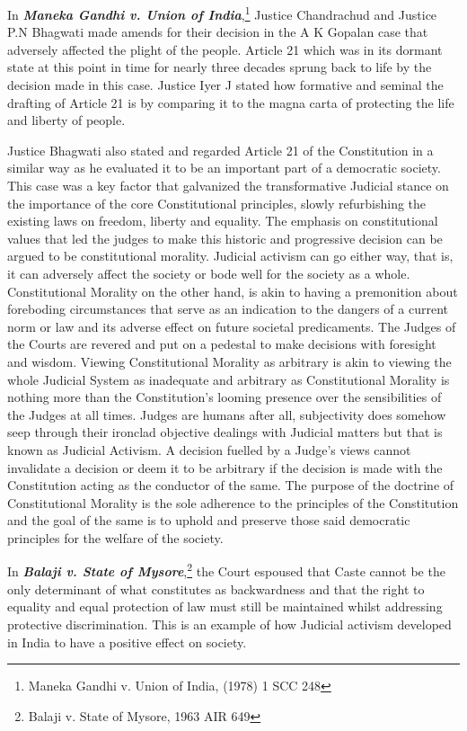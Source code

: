 \begin{multicols}{2}
\noi
In \textbf{\textit{Maneka Gandhi v. Union of India}},\footnote{Maneka Gandhi v. Union of India, (1978) 1 SCC 248}  Justice Chandrachud and Justice P.N Bhagwati made
amends for their decision in the A K Gopalan case that adversely affected the plight of the
people. Article 21 which was in its dormant state at this point in time for nearly three decades
sprung back to life by the decision made in this case. Justice Iyer J stated how formative and seminal the drafting of Article 21 is by comparing it to the magna carta of protecting the life
and liberty of people.

\noi
Justice Bhagwati also stated and regarded Article 21 of the Constitution in a similar way as
he evaluated it to be an important part of a democratic society. This case was a key factor that
galvanized the transformative Judicial stance on the importance of the core Constitutional
principles, slowly refurbishing the existing laws on freedom, liberty and equality. The
emphasis on constitutional values that led the judges to make this historic and progressive
decision can be argued to be constitutional morality. Judicial activism can go either way, that
is, it can adversely affect the society or bode well for the society as a whole. Constitutional
Morality on the other hand, is akin to having a premonition about foreboding circumstances
that serve as an indication to the dangers of a current norm or law and its adverse effect on
future societal predicaments. The Judges of the Courts are revered and put on a pedestal to
make decisions with foresight and wisdom. Viewing Constitutional Morality as arbitrary is
akin to viewing the whole Judicial System as inadequate and arbitrary as Constitutional
Morality is nothing more than the Constitution’s looming presence over the sensibilities of
the Judges at all times. Judges are humans after all, subjectivity does somehow seep through
their ironclad objective dealings with Judicial matters but that is known as Judicial Activism.
A decision fuelled by a Judge’s views cannot invalidate a decision or deem it to be arbitrary
if the decision is made with the Constitution acting as the conductor of the same. The purpose
of the doctrine of Constitutional Morality is the sole adherence to the principles of the
Constitution and the goal of the same is to uphold and preserve those said democratic
principles for the welfare of the society.

\noi
In \textbf{\textit{Balaji v. State of Mysore}},\footnote{Balaji v. State of Mysore, 1963 AIR 649} the Court espoused that Caste cannot be the only determinant of what constitutes as backwardness and that the right to equality and equal protection of law must still be maintained whilst addressing protective discrimination. This is an example of
how Judicial activism developed in India to have a positive effect on society.


\end{multicols}
